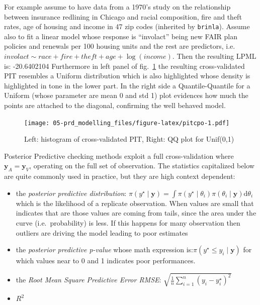 \documentclass[
  12pt,
  a4paper,
  oneside]{book}
\newcommand{\passthrough}[1]{#1}
\providecommand{\tightlist}{%
  \setlength{\itemsep}{0pt}\setlength{\parskip}{0pt}}
\theoremstyle{definition}
\theoremstyle{definition}
\theoremstyle{definition}
\theoremstyle{remark}
\begin{document}
For example assume to have data from a 1970's study on the relationship between insurance redlining in Chicago and racial composition, fire and theft rates, age of housing and income in 47 zip codes (inherited by \passthrough{\lstinline!brinla!}\citep{brinla}). Assume also to fit a linear model whose response is ``involact'' being new FAIR plan policies and renewals per 100 housing units and the rest are predictors, i.e.~\(involact \sim race + fire +theft + age + \log(income)\).
Then the resulting LPML is: -20.6402104
Furthermore in left panel of fig.~\ref{fig:pitcpo} the resulting cross-validated PIT resembles a Uniform distribution which is also highlighted whose density is highlighted in tone in the lower part. In the right side a Quantile-Quantile for a Uniform (whose parameter are mean 0 and std 1) plot evidences how much the points are attached to the diagonal, confirming the well behaved model.

\begin{figure}
\centering
\texttt{[image: 05-prd\_modelling\_files/figure-latex/pitcpo-1.pdf]}
\caption{\label{fig:pitcpo}Left: histogram of cross-validated PIT, Right: QQ plot for Unif(0,1)}
\end{figure}

Posterior Predictive checking methods \citep{gelman1996posterior} exploit a full cross-validation where \(\boldsymbol{y}_{A} = \boldsymbol{y}_{V}\), operating on the full set of observation. The statistics capitalized below are quite commonly used in practice, but they are high context dependent:

\begin{itemize}
\tightlist
\item
  the \emph{posterior predictive distribution}: \(\pi(y^{\star} \mid \boldsymbol{y}) = \int \pi(y^{\star} \mid \theta_{i})\pi({\theta_{i}} \mid \boldsymbol{y})\mathrm{d}\theta_{i}\) which is the likelihood of a replicate observation. When values are small that indicates that are those values are coming from tails, since the area under the curve (i.e.~probability) is less. If this happens for many observation then outliers are driving the model leading to poor estimates
\item
  the \emph{posterior predictive p-value} whose math expression is:\(\pi(y^{\star} \leq y_{i} \mid \boldsymbol{y})\) for which values near to 0 and 1 indicates poor performances.
\item
  the \emph{Root Mean Square Predictive Error RMSE}: \(\sqrt{\frac{1}{n} \sum_{i=1}^{n}(y_{i}-{y}^{\star}_{i})^{2}}\)
\item
  \(R^2\)
\end{itemize}
\end{document}
